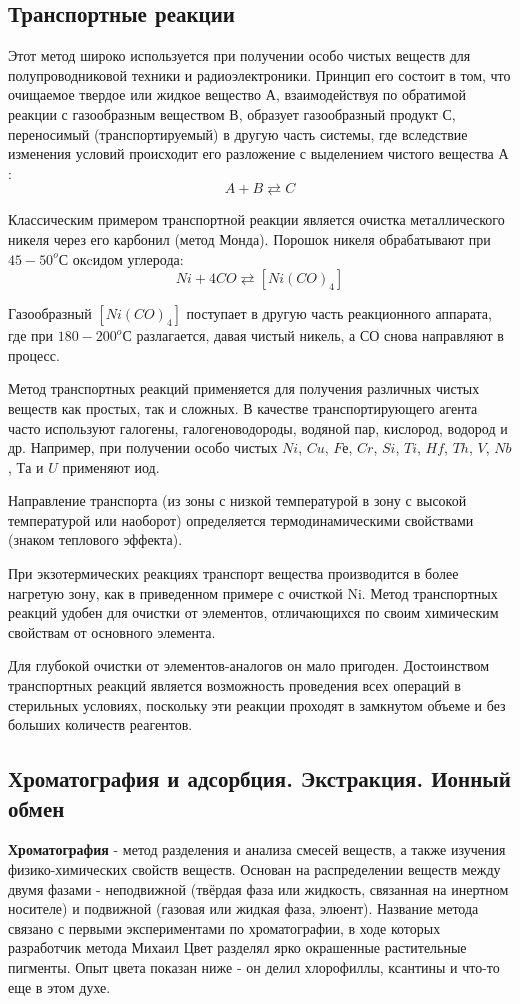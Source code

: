 \documentclass[14pt,a4paper]{scrartcl}
\begin{document}
\subsection*{Транспортные реакции}
Этот метод широко используется при получении особо чистых веществ для полупроводниковой техники и радиоэлектроники. Принцип его состоит в том, что очищаемое твердое или жидкое вещество $А$, взаимодействуя по обратимой реакции с газообразным веществом $В$, образует газообразный продукт $С$, переносимый (транспортируемый) в другую часть системы, где вследствие изменения условий происходит его разложение с выделением чистого вещества $А$:
$$A + B \rightleftarrows C$$

Классическим примером транспортной реакции является очистка металлического никеля через его карбонил (метод Монда). Порошок никеля обрабатывают при $45-50 ^oС$ окcидом углерода:
$$Ni + 4CO \rightleftarrows \left[Ni(CO)_4\right]$$

Газообразный $[Ni(CO)_4]$ поступает в другую часть реакционного аппарата, где при $180-200 ^oС$ разлагается, давая чистый никель, а $СО$ снова направляют в процесс.

Метод транспортных реакций применяется для получения различных чистых веществ как простых, так и сложных. В качестве транспортирующего агента часто используют галогены, галогеноводороды, водяной пар, кислород, водород и др. Например, при получении особо чистых $Ni$, $Cu$, $Fе$, $Cr$, $Si$, $Ti$, $Hf$, $Th$, $V$, $Nb$, $Та$ и $U$ применяют иод.

Направление транспорта (из зоны с низкой температурой в зону с высокой температурой или наоборот) определяется термодинамическими свойствами (знаком теплового эффекта).

При экзотермических реакциях транспорт вещества производится в более нагретую зону, как в приведенном примере с очисткой Ni. Метод транспортных реакций удобен для очистки от элементов, отличающихся по своим химическим свойствам от основного элемента.

Для глубокой очистки от элементов-аналогов он мало пригоден. Достоинством транспортных реакций является возможность проведения всех операций в стерильных условиях, поскольку эти реакции проходят в замкнутом объеме и без больших количеств реагентов.

\subsection*{Хроматография и адсорбция. Экстракция. Ионный обмен} 
\textbf{Хроматография} -  метод разделения и анализа смесей веществ, а также изучения физико-химических свойств веществ. Основан на распределении веществ между двумя фазами - неподвижной (твёрдая фаза или жидкость, связанная на инертном носителе) и подвижной (газовая или жидкая фаза, элюент). Название метода связано с первыми экспериментами по хроматографии, в ходе которых разработчик метода Михаил Цвет разделял ярко окрашенные растительные пигменты. Опыт цвета показан ниже - он делил хлорофиллы, ксантины и что-то еще в этом духе.
\end{document}
